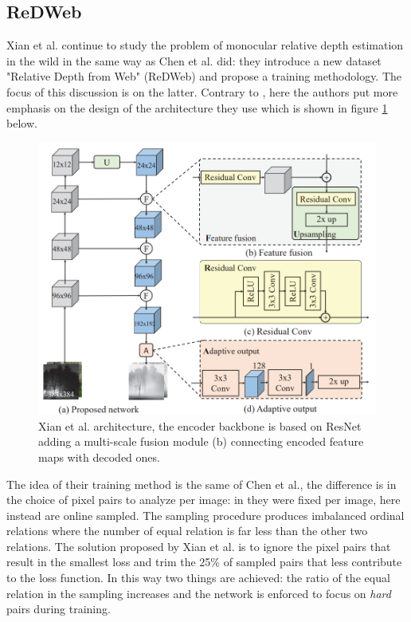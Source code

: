 \subsection{ReDWeb}
Xian et al. \cite{ReDWeb} continue to study the problem of monocular relative depth estimation in the wild in the same way as Chen et al. \cite{DIW} did: they introduce a new dataset "Relative Depth from Web" (ReDWeb) and propose a training methodology.
The focus of this discussion is on the latter.
Contrary to \cite{DIW}, here the authors put more emphasis on the design of the architecture they use which is shown in figure \ref{fig:ReDWeb_architecture} below.

\begin{figure}
\centering
\includegraphics[scale=0.4]{figs/ReDWeb_architecture}
\caption{Xian et al. \cite{ReDWeb} architecture, the encoder backbone is based on ResNet \cite{ResNet} adding a multi-scale fusion module (b) connecting encoded feature maps with decoded ones. \label{fig:ReDWeb_architecture}}
\end{figure}

The idea of their training method is the same of Chen et al., the difference is in the choice of pixel pairs to analyze per image: in \cite{DIW} they were fixed per image, here instead are online sampled.
The sampling procedure produces imbalanced ordinal relations where the number of equal relation is far less than the other two relations.
The solution proposed by Xian et al. is to ignore the pixel pairs that result in the smallest loss and trim the 25\% of sampled pairs that less contribute to the loss function.
In this way two things are achieved: the ratio of the equal relation in the sampling increases and the network is enforced to focus on \textit{hard} pairs during training.

